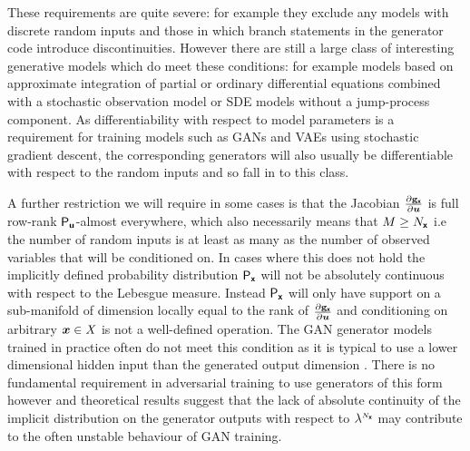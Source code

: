 These requirements are quite severe: for example they exclude any models with discrete random inputs and those in which branch statements in the generator code introduce discontinuities. However there are still a large class of interesting generative models which do meet these conditions: for example models based on approximate integration of partial or ordinary differential equations combined with a stochastic observation model or \ac{SDE} models without a jump-process component. As differentiability with respect to model parameters is a requirement for training models such as \acp{GAN} and \acp{VAE} using stochastic gradient descent, the corresponding generators will also usually be differentiable with respect to the random inputs and so fall in to this class.

A further restriction we will require in some cases is that the Jacobian $\frac{\partial {\mathbf{g}}_{\boldsymbol{\mathsf{x}}}}{\partial \boldsymbol{u}}$ is full row-rank $\mathsf{P}_{\boldsymbol{\mathsf{u}}}$-almost everywhere, which also necessarily means that $M \geq N_{\boldsymbol{\mathsf{x}}}$ i.e the number of random inputs is at least as many as the number of observed variables that will be conditioned on. In cases where this does not hold the implicitly defined probability distribution $\mathsf{P}_{\boldsymbol{\mathsf{x}}}$ will not be absolutely continuous with respect to the Lebesgue measure. Instead $\mathsf{P}_{\boldsymbol{\mathsf{x}}}$ will only have support on a sub-manifold of dimension locally equal to the rank of $\frac{\partial {\mathbf{g}}_{\boldsymbol{\mathsf{x}}}}{\partial \boldsymbol{u}}$ and conditioning on arbitrary $\boldsymbol{x} \in \mathit{X}$ is not a well-defined operation. The \ac{GAN} generator models trained in practice often do not meet this condition as it is typical to use a lower dimensional hidden input than the generated output dimension \citep{arjovsky2017towards}. There is no fundamental requirement in adversarial training to use generators of this form however and theoretical results \citep{arjovsky2017towards} suggest that the lack of absolute continuity of the implicit distribution on the generator outputs with respect to $\lebm{N_{\rvct{x}}}$ may contribute to the often unstable behaviour of \ac{GAN} training.

